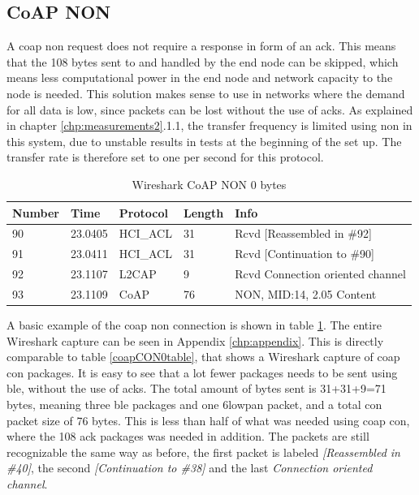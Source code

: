 
\subsection{CoAP NON}

\noindent A \gls{coap} \gls{non} request does not require a response in form of an \gls{ack}. This means that the 108 bytes sent to and handled by the end node can be skipped, which means less computational power in the end node and network capacity to the node is needed. This solution makes sense to use in networks where the demand for all data is low, since packets can be lost without the use of \glspl{ack}. As explained in chapter \ref{chp:measurements2}.1.1, the transfer frequency is limited using \gls{non} in this system, due to unstable results in tests at the beginning of the set up. The transfer rate is therefore set to one per second for this protocol. 

\begin{table}[ht]
\small
\centering
\caption{Wireshark CoAP NON 0 bytes}
\label{coapNON0table}
\begin{tabular}{lllll}
\hline
Number & Time    & Protocol & Length & Info                             \\ \hline
90     & 23.0405 & HCI\_ACL & 31     & Rcvd {[}Reassembled in \#92{]}   \\
91     & 23.0411 & HCI\_ACL & 31     & Rcvd {[}Continuation to \#90{]}  \\
92     & 23.1107 & L2CAP    & 9      & Rcvd Connection oriented channel \\
93     & 23.1109 & CoAP     & 76     & NON, MID:14, 2.05 Content        \\ \hline
\end{tabular}
\end{table}


\noindent A basic example of the \gls{coap} \gls{non} connection is shown in table \ref{coapNON0table}. The entire Wireshark capture can be seen in Appendix \ref{chp:appendix}. This is directly comparable to table \ref{coapCON0table}, that shows a Wireshark capture of \gls{coap} \gls{con} packages. It is easy to see that a lot fewer packages needs to be sent using \gls{ble}, without the use of \glspl{ack}. The total amount of bytes sent is 31+31+9=71 bytes, meaning three \gls{ble} packages and one \gls{6lowpan} packet, and a total \gls{con} packet size of 76 bytes. This is less than half of what was needed using \gls{coap} \gls{con}, where the 108 \gls{ack} packages was needed in addition. The packets are still recognizable the same way as before, the first packet is labeled \textit{[Reassembled in \#40]}, the second \textit{[Continuation to \#38]} and the last \textit{Connection oriented channel}.

